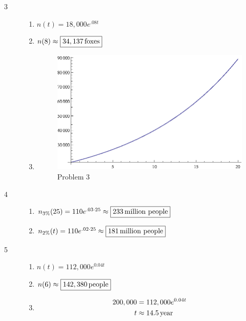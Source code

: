 \documentclass{exam}
\begin{document}
\begin{description}
      \item[3]
        \begin{enumerate}[a]
          \item $\boxed{ n(t) = 18,000 e^{.08t} }$

          \item $n(8) \approx \boxed{ \unit[34,137]{foxes}} $

          \item
            \begin{figure}[H]
              \centering
              \includegraphics{problem3.eps}
              \caption{Problem 3}
            \end{figure}
        \end{enumerate}

      \item[4] 
        \begin{enumerate}[a]
          \item $n_{3\%}(25) = 110 e^{.03 \cdot 25} \approx \boxed{ \unit[233]{million \ people}}$

          \item $n_{2\%}(t) = 110 e^{.02\cdot 25} \approx \boxed{ \unit[181]{million \ people}}$
        \end{enumerate}

      \item[5] 
        \begin{enumerate}[a]
          \item $n(t) = 112,000 e^{0.04t}$

          \item $n(6) \approx \boxed{\unit[142,380]{people}}$

          \item 
            \begin{align*}
              200,000 & = 112,000 e^{0.04t} \\
              t       & \approx \unit[14.5]{year} \\
            \end{align*}


\end{enumerate}
\end{description}
\end{document}
